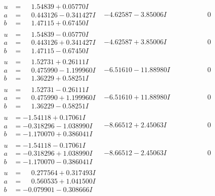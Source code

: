 \documentclass[1p]{elsarticle_modified}
\theoremstyle{definition}
\begin{document}
$$\begin{array}{c|c|c}
\begin{aligned}
u &= \phantom{-}1.54839 + 0.05770 I \\
a &= \phantom{-}0.443126 - 0.341427 I \\
b &= \phantom{-}1.47115 + 0.67450 I\end{aligned}
 & -4.62587 - 3.85006 I & \phantom{-0.000000 } 0 \\ \hline\begin{aligned}
u &= \phantom{-}1.54839 - 0.05770 I \\
a &= \phantom{-}0.443126 + 0.341427 I \\
b &= \phantom{-}1.47115 - 0.67450 I\end{aligned}
 & -4.62587 + 3.85006 I & \phantom{-0.000000 } 0 \\ \hline\begin{aligned}
u &= \phantom{-}1.52731 + 0.26111 I \\
a &= \phantom{-}0.475990 - 1.199960 I \\
b &= \phantom{-}1.36229 + 0.58251 I\end{aligned}
 & -6.51610 - 11.88980 I & \phantom{-0.000000 } 0 \\ \hline\begin{aligned}
u &= \phantom{-}1.52731 - 0.26111 I \\
a &= \phantom{-}0.475990 + 1.199960 I \\
b &= \phantom{-}1.36229 - 0.58251 I\end{aligned}
 & -6.51610 + 11.88980 I & \phantom{-0.000000 } 0 \\ \hline\begin{aligned}
u &= -1.54118 + 0.17061 I \\
a &= -0.318296 - 1.038990 I \\
b &= -1.170070 + 0.386041 I\end{aligned}
 & -8.66512 + 2.45063 I & \phantom{-0.000000 } 0 \\ \hline\begin{aligned}
u &= -1.54118 - 0.17061 I \\
a &= -0.318296 + 1.038990 I \\
b &= -1.170070 - 0.386041 I\end{aligned}
 & -8.66512 - 2.45063 I & \phantom{-0.000000 } 0 \\ \hline\begin{aligned}
u &= \phantom{-}0.277564 + 0.317493 I \\
a &= \phantom{-}0.560535 + 1.041500 I \\
b &= -0.079901 - 0.308666 I\end{aligned}

\end{array}$$
\end{document}
